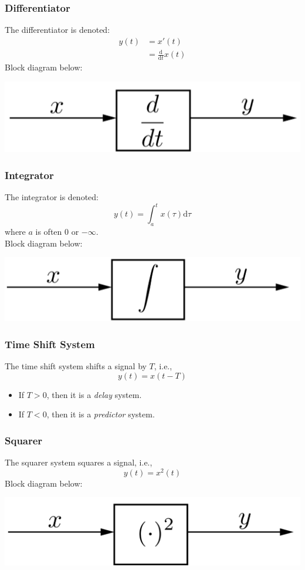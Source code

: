\documentclass[10pt]{article}
\begin{document}
\subsubsection*{Differentiator}
The differentiator is denoted:
\begin{align*}
    y(t) &= x'(t)\\
    &= \frac{\text{d}}{\text{d}t} x(t)
\end{align*}
Block diagram below:
\begin{center}
    \includegraphics[scale=0.8]{W2_11.png}
\end{center}
\subsubsection*{Integrator}
The integrator is denoted:
\[y(t) = \int_a^t x(\tau) \text{d}\tau\]
where $a$ is often 0 or $-\infty$.\\
Block diagram below:
\begin{center}
    \includegraphics[scale=0.8]{W2_12.png}
\end{center}
\subsubsection*{Time Shift System}
The time shift system shifts a signal by $T$, i.e., 
\[y(t) = x(t - T)\]
\begin{itemize}
    \item If $T > 0$, then it is a \textit{delay} system.
    \item If $T < 0$, then it is a \textit{predictor} system.
\end{itemize}
\subsubsection*{Squarer}
The squarer system squares a signal, i.e.,
\[y(t) = x^2(t)\]
Block diagram below:
\begin{center}
    \includegraphics[scale=0.8]{W2_13.png}
\end{center}
\end{document}

